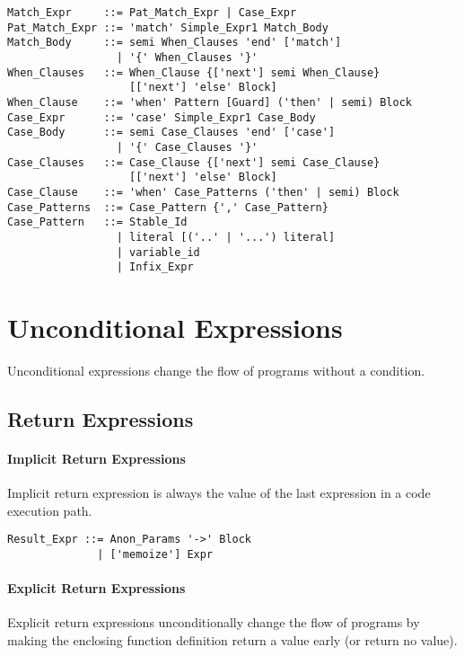 \syntax\begin{lstlisting}
Match_Expr     ::= Pat_Match_Expr | Case_Expr
Pat_Match_Expr ::= 'match' Simple_Expr1 Match_Body
Match_Body     ::= semi When_Clauses 'end' ['match']
                 | '{' When_Clauses '}'
When_Clauses   ::= When_Clause {['next'] semi When_Clause} 
                   [['next'] 'else' Block]
When_Clause    ::= 'when' Pattern [Guard] ('then' | semi) Block
Case_Expr      ::= 'case' Simple_Expr1 Case_Body
Case_Body      ::= semi Case_Clauses 'end' ['case']
                 | '{' Case_Clauses '}'
Case_Clauses   ::= Case_Clause {['next'] semi Case_Clause}
                   [['next'] 'else' Block]
Case_Clause    ::= 'when' Case_Patterns ('then' | semi) Block
Case_Patterns  ::= Case_Pattern {',' Case_Pattern}
Case_Pattern   ::= Stable_Id
                 | literal [('..' | '...') literal]
                 | variable_id
                 | Infix_Expr
\end{lstlisting}






\section{Unconditional Expressions}

Unconditional expressions change the flow of programs without a condition. 

\subsection{Return Expressions}
\label{sec:return-expressions}

\paragraph{Implicit Return Expressions}
Implicit return expression is always the value of the last expression in a code execution path. 

\syntax\begin{lstlisting}
Result_Expr ::= Anon_Params '->' Block 
              | ['memoize'] Expr
\end{lstlisting}

\paragraph{Explicit Return Expressions}
Explicit return expressions unconditionally change the flow of programs by making the enclosing function definition return a value early (or return no value). 

